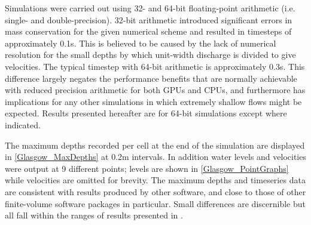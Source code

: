 \documentclass[11pt,english,a4paper]{article}
\begin{document}
Simulations were carried out using 32- and 64-bit floating-point arithmetic (i.e. single- and double-precision). 32-bit arithmetic introduced significant errors in mass conservation for the given numerical scheme and resulted in timesteps of approximately 0.1s. This is believed to be caused by the lack of numerical resolution for the small depths by which unit-width discharge is divided to give velocities. The typical timestep with 64-bit arithmetic is approximately 0.3s. This difference largely negates the performance benefits that are normally achievable with reduced precision arithmetic for both GPUs and CPUs, and furthermore has implications for any other simulations in which extremely shallow flows might be expected. Results presented hereafter are for 64-bit simulations except where indicated.

The maximum depths recorded per cell at the end of the simulation are displayed in \ref{Glasgow_MaxDepths} at 0.2m intervals. In addition water levels and velocities were output at 9 different points; levels are shown in \ref{Glasgow_PointGraphs} while velocities are omitted for brevity. The maximum depths and timeseries data are consistent with results produced by other software, and close to those of other finite-volume software packages in particular. Small differences are discernible but all fall within the ranges of results presented in \citet{Pender2010}.
\end{document}
